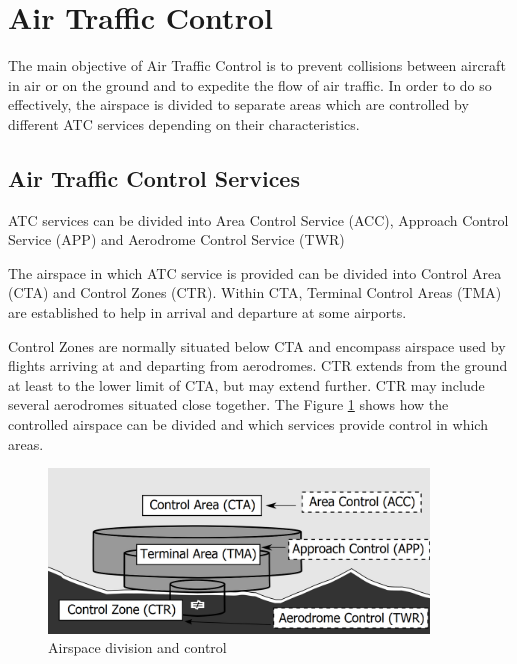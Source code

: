 
\section{Air Traffic Control}

The main objective of Air Traffic Control is to prevent collisions between aircraft in air or on the ground and to expedite the flow of air traffic. \cite[Chapter 2.2]{annex11} In order to do so effectively, the airspace is divided to separate areas which are controlled by different ATC services depending on their characteristics.

\subsection{Air Traffic Control Services}

ATC services can be divided into Area Control Service (ACC), Approach Control Service (APP) and Aerodrome Control Service (TWR) \cite[Chapter 1]{doc4444} 

The airspace in which ATC service is provided can be divided into Control Area (CTA) and Control Zones (CTR). Within CTA, Terminal Control Areas (TMA) are established to help in arrival and departure at some airports.

Control Zones are normally situated below CTA and encompass airspace used by flights arriving at and departing from aerodromes. CTR extends from the ground at least to the lower limit of CTA, but may extend further. CTR may include several aerodromes situated close together. \cite[Chapter 2.10]{annex11} The Figure \ref{fig:airspace} shows how the controlled airspace can be divided and which services provide control in which areas.

\begin{figure}[h]
    \centering
    \includegraphics[width=0.9\textwidth]{figures/airspace.png}
    \caption{Airspace division and control \cite[Chapter 2.10]{annex11}}
    \label{fig:airspace}
\end{figure}

